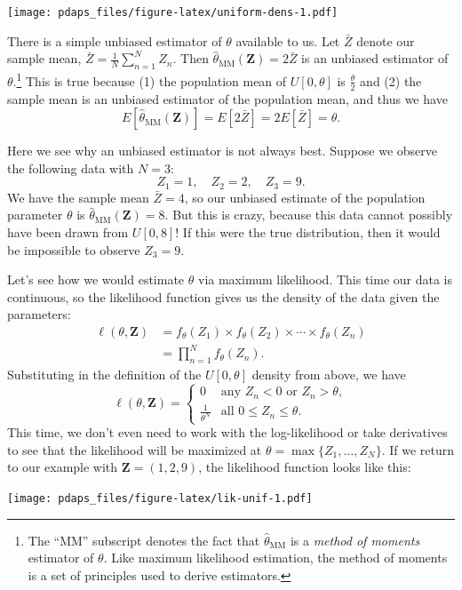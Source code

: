 \documentclass[
  12pt,
  oneside,openany]{book}
\begin{document}
\texttt{[image: pdaps\_files/figure-latex/uniform-dens-1.pdf]}

There is a simple unbiased estimator of \(\theta\) available to us.
Let \(\bar{Z}\) denote our sample mean, \(\bar{Z} = \frac{1}{N} \sum_{n=1}^N Z_n\).
Then \(\hat{\theta}_{\text{MM}}(\mathbf{Z}) = 2 \bar{Z}\) is an unbiased estimator of \(\theta\).\footnote{The ``MM'' subscript denotes the fact that \(\hat{\theta}_{\text{MM}}\) is a \emph{method of moments} estimator of \(\theta\). Like maximum likelihood estimation, the method of moments is a set of principles used to derive estimators.}
This is true because (1) the population mean of \(U[0, \theta]\) is \(\frac{\theta}{2}\) and (2) the sample mean is an unbiased estimator of the population mean, and thus we have
\[
E[\hat{\theta}_{\text{MM}}(\mathbf{Z})]
= E[2 \bar{Z}]
= 2 E[\bar{Z}]
= \theta.
\]

Here we see why an unbiased estimator is not always best.
Suppose we observe the following data with \(N = 3\):
\[
Z_1 = 1, \quad Z_2 = 2, \quad Z_3 = 9.
\]
We have the sample mean \(\bar{Z} = 4\), so our unbiased estimate of the population parameter \(\theta\) is \(\hat{\theta}_{\text{MM}}(\mathbf{Z}) = 8\).
But this is crazy, because this data cannot possibly have been drawn from \(U[0, 8]\)!
If this were the true distribution, then it would be impossible to observe \(Z_3 = 9\).

Let's see how we would estimate \(\theta\) via maximum likelihood.
This time our data is continuous, so the likelihood function gives us the density of the data given the parameters:
\[
\begin{aligned}
\ell(\theta, \mathbf{Z})
&= f_\theta(Z_1) \times f_\theta(Z_2) \times \cdots \times f_\theta(Z_n) \\
&= \prod_{n=1}^N f_\theta(Z_n).
\end{aligned}
\]
Substituting in the definition of the \(U[0, \theta]\) density from above, we have
\[
\ell(\theta, \mathbf{Z}) = \begin{cases}
0 & \text{any $Z_n < 0$ or $Z_n > \theta$}, \\
\frac{1}{\theta^N} & \text{all $0 \leq Z_n \leq \theta$}.
\end{cases}
\]
This time, we don't even need to work with the log-likelihood or take derivatives to see that the likelihood will be maximized at \(\theta = \max \{Z_1, \ldots, Z_N\}\).
If we return to our example with \(\mathbf{Z} = (1, 2, 9)\), the likelihood function looks like this:

\texttt{[image: pdaps\_files/figure-latex/lik-unif-1.pdf]}
\end{document}
